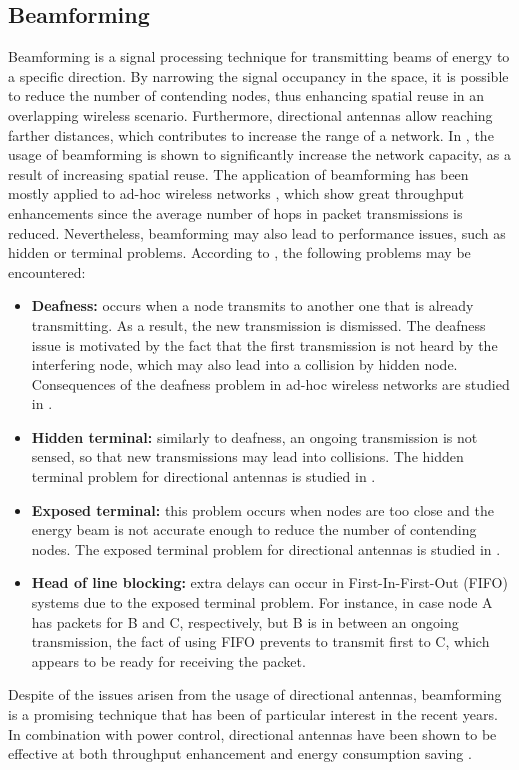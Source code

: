 \documentclass[12pt, a4paper,twoside]{tesi_upf}
\begin{document}
		\subsection{Beamforming}
		\label{section:beamforming}
			Beamforming \cite{van1988beamforming} is a signal processing technique for transmitting beams of energy to a specific direction. By narrowing the signal occupancy in the space, it is possible to reduce the number of contending nodes, thus enhancing spatial reuse in an overlapping wireless scenario. Furthermore, directional antennas allow reaching farther distances, which contributes to increase the range of a network. In \cite{athan2004antenna}, the usage of beamforming is shown to significantly increase the network capacity, as a result of increasing spatial reuse. The application of beamforming has been mostly applied to ad-hoc wireless networks \cite{ramanathan2001performance, spyropoulos2003capacity, yi2003capacity}, which show great throughput enhancements since the average number of hops in packet transmissions is reduced. Nevertheless, beamforming may also lead to performance issues, such as hidden or terminal problems. According to \cite{alawieh2009improving}, the following problems may be encountered:
			\begin{itemize}
				\item \textbf{Deafness:} occurs when a node transmits to another one that is already transmitting. As a result, the new transmission is dismissed. The deafness issue is motivated by the fact that the first transmission is not heard by the interfering node, which may also lead into a collision by hidden node. Consequences of the deafness problem in ad-hoc wireless networks are studied in \cite{choudhury2005performance}.
				\item \textbf{Hidden terminal:} similarly to deafness, an ongoing transmission is not sensed, so that new transmissions may lead into collisions. The hidden terminal problem for directional antennas is studied in \cite{arora2004directional}. 
				\item \textbf{Exposed terminal:} this problem occurs when nodes are too close and the energy beam is not accurate enough to reduce the number of contending nodes. The exposed terminal problem for directional antennas is studied in \cite{wang2005syn}.
				\item \textbf{Head of line blocking:} extra delays can occur in First-In-First-Out (FIFO) systems due to the exposed terminal problem. For instance, in case node A has packets for B and C, respectively, but B is in between an ongoing transmission, the fact of using FIFO prevents to transmit first to C, which appears to be ready for receiving the packet.
			\end{itemize}
			Despite of the issues arisen from the usage of directional antennas, beamforming is a promising technique that has been of particular interest in the recent years. In combination with power control, directional antennas have been shown to be effective at both throughput enhancement and energy consumption saving \cite{fahmy2002ad, nasipuri2002power}.	
		
\end{document}
